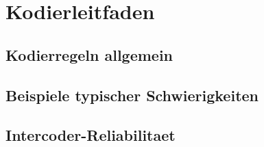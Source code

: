 \chapter{Kodierleitfaden}\label{app:kodierleitfaden}

\section*{Kodierregeln allgemein}

\section*{Beispiele typischer Schwierigkeiten}

\section*{Intercoder-Reliabilitaet}
